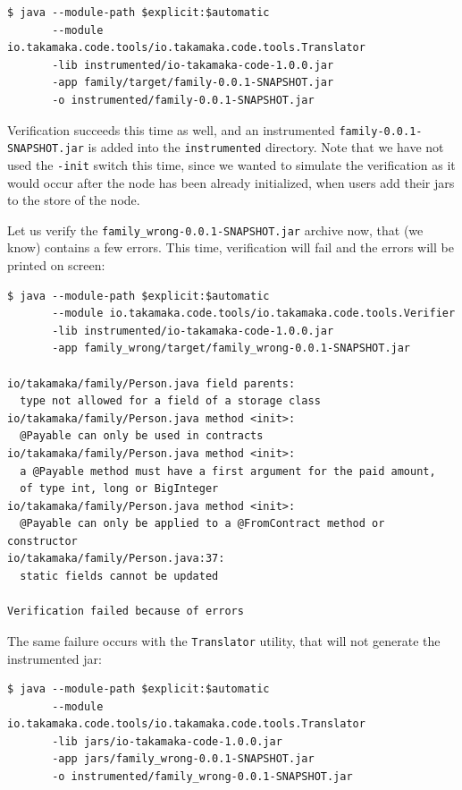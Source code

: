 \documentclass[a4paper,]{book}
\begin{document}
{\begin{myverbatim}
\begin{verbatim}
$ java --module-path $explicit:$automatic
       --module io.takamaka.code.tools/io.takamaka.code.tools.Translator
       -lib instrumented/io-takamaka-code-1.0.0.jar
       -app family/target/family-0.0.1-SNAPSHOT.jar
       -o instrumented/family-0.0.1-SNAPSHOT.jar
\end{verbatim}
\end{myverbatim}

Verification succeeds this time as well, and an instrumented
\texttt{family-0.0.1-SNAPSHOT.jar} is added into the
\texttt{instrumented} directory. Note that we have not used the
\texttt{-init} switch this time, since we wanted to simulate the
verification as it would occur after the node has been already
initialized, when users add their jars to the store of the node.

Let us verify the \texttt{family\_wrong-0.0.1-SNAPSHOT.jar} archive now,
that (we know) contains a few errors. This time, verification will fail
and the errors will be printed on screen:

\begin{myverbatim}
\begin{verbatim}
$ java --module-path $explicit:$automatic
       --module io.takamaka.code.tools/io.takamaka.code.tools.Verifier
       -lib instrumented/io-takamaka-code-1.0.0.jar
       -app family_wrong/target/family_wrong-0.0.1-SNAPSHOT.jar

io/takamaka/family/Person.java field parents:
  type not allowed for a field of a storage class
io/takamaka/family/Person.java method <init>:
  @Payable can only be used in contracts
io/takamaka/family/Person.java method <init>:
  a @Payable method must have a first argument for the paid amount,
  of type int, long or BigInteger
io/takamaka/family/Person.java method <init>:
  @Payable can only be applied to a @FromContract method or constructor
io/takamaka/family/Person.java:37:
  static fields cannot be updated

Verification failed because of errors
\end{verbatim}
\end{myverbatim}

The same failure occurs with the \texttt{Translator} utility, that will
not generate the instrumented jar:

\begin{myverbatim}
\begin{verbatim}
$ java --module-path $explicit:$automatic
       --module io.takamaka.code.tools/io.takamaka.code.tools.Translator
       -lib jars/io-takamaka-code-1.0.0.jar
       -app jars/family_wrong-0.0.1-SNAPSHOT.jar
       -o instrumented/family_wrong-0.0.1-SNAPSHOT.jar


\end{verbatim}
\end{myverbatim}}
\end{document}

